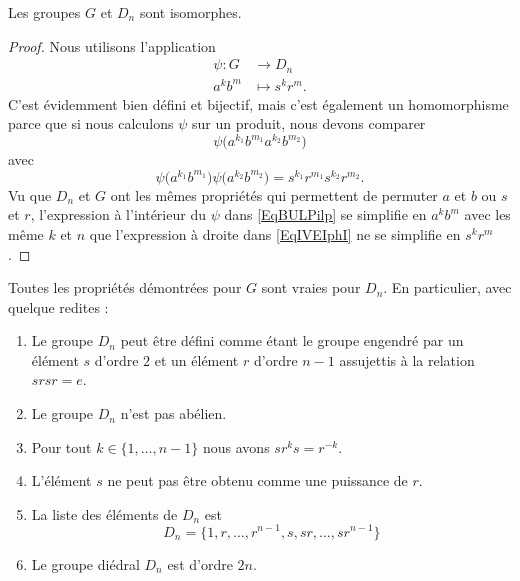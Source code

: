 \begin{theorem}
    Les groupes \( G\) et \( D_n\) sont isomorphes.
\end{theorem}

\begin{proof}
        Nous utilisons l'application
    \begin{equation}
        \begin{aligned}
            \psi\colon G&\to D_n \\
            a^kb^m&\mapsto s^kr^m. 
        \end{aligned}
    \end{equation}
    C'est évidemment bien défini et bijectif, mais c'est également un homomorphisme parce que si nous calculons \( \psi\) sur un produit, nous devons comparer
    \begin{equation}        \label{EqBULPilp}
        \psi\big( a^{k_1}b^{m_1}a^{k_2}b^{m_2} \big)
    \end{equation}
    avec
    \begin{equation}        \label{EqIVEIphI}
        \psi\big( a^{k_1}b^{m_1}\big)\psi\big(a^{k_2}b^{m_2} \big)= s^{k_1}r^{m_1}s^{k_2}r^{m_2}.
    \end{equation}
    Vu que \( D_n\) et \( G\) ont les mêmes propriétés qui permettent de permuter \( a\) et \( b\) ou \( s\) et \( r\), l'expression à l'intérieur du \( \psi\) dans \eqref{EqBULPilp} se simplifie en \( a^kb^m\) avec les même \( k\) et \( n\) que l'expression à droite dans \eqref{EqIVEIphI} ne se simplifie en \( s^kr^m\).
\end{proof}

\begin{corollary}
    Toutes les propriétés démontrées pour \( G\) sont vraies pour \( D_n\). En particulier, avec quelque redites :
    \begin{enumerate}
        \item
            Le groupe \( D_n\) peut être défini comme étant le groupe engendré par un élément \( s\) d'ordre \( 2\) et un élément \( r\) d'ordre \( n-1\) assujettis à la relation \( srsr=e\).
        \item
            Le groupe \( D_n\) n'est pas abélien.
        \item
            Pour tout \( k\in\{ 1,\ldots, n-1 \}\) nous avons \( sr^ks=r^{-k}\).
        \item
            L'élément \( s\) ne peut pas être obtenu comme une puissance de \( r\).
        \item
            La liste des éléments de \( D_n\) est
            \begin{equation}
                D_n=\{ 1,r,\ldots, r^{n-1},s,sr,\ldots, sr^{n-1} \}
            \end{equation}
        \item
            Le groupe diédral \( D_n\) est d'ordre \( 2n\).
    \end{enumerate}
\end{corollary}

